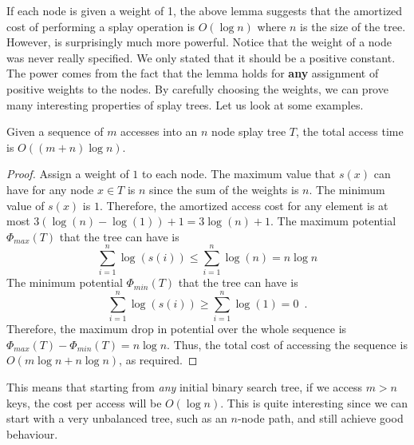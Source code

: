 {If each node is given a weight of 1, the above lemma suggests that the
amortized cost of performing a splay operation is $O(\log n)$ where
$n$ is the size of the tree. However,  is
surprisingly much more powerful. Notice that the weight of a node was
never really specified. We only stated that it should be a positive
constant. The power comes from the fact that the lemma holds for {\bf
any} assignment of positive weights to the nodes. By carefully
choosing the weights, we can prove many interesting properties of
splay trees. Let us look at some examples.

\begin{thm}
Given a sequence of $m$ accesses into an $n$ node splay tree $T$, the
total access time is $O((m+n)\log n)$.
\end{thm}

\begin{proof}
Assign a weight of $1$ to each node. The maximum value that $s(x)$
can have for any node $x \in T$ is $n$ since the sum of the weights is
$n$. The minimum value of $s(x)$ is $1$. Therefore, the amortized access cost
for any element is at most $3(\log(n) - \log(1)) + 1 = 3\log(n)
+1$. The maximum potential $\Phi_{max}(T)$ that the tree can have is
\[
   \sum_{i=1}^n \log(s(i)) \leq \sum_{i=1}^n \log(n) = n\log n 
\]
The minimum
potential $\Phi_{min}(T)$ that the tree can have is 
\[
   \sum_{i=1}^n \log(s(i)) \geq \sum_{i=1}^n \log(1) = 0 \enspace .
\]
Therefore, the maximum drop in potential over the whole sequence is
$\Phi_{max}(T) - \Phi_{min}(T) = n\log n$.  Thus, the total cost of
accessing the sequence is $O(m\log n + n\log n)$, as required.
\end{proof}

This means that starting from \emph{any} initial binary search tree, if
we access $m > n$ keys, the cost per access will be $O(\log n)$. This
is quite interesting since we can start with a very unbalanced tree,
such as an $n$-node path, and still achieve good behaviour.

%

}
